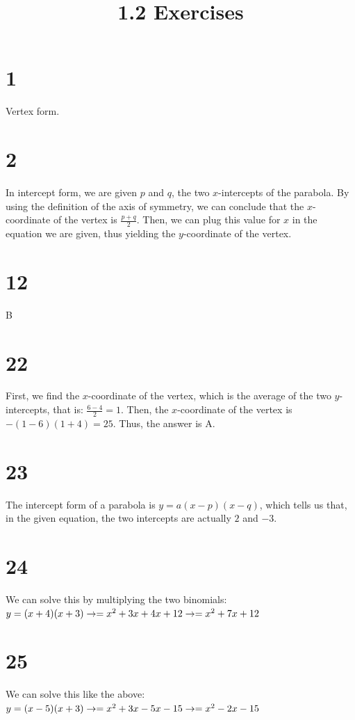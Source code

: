 \documentclass{article}
\title{1.2 Exercises}
\theoremstyle{definition}
\begin{document}
\maketitle


\section*{1}
Vertex form.

\section*{2}
In intercept form, we are given $p$ and $q$, the two $x$-intercepts of the parabola. By using the definition of the axis of symmetry, we can conclude 
that the $x$-coordinate of the vertex is $\frac{p+q}{2}$. Then, we can plug this value for $x$ in the equation we are given, thus yielding the $y$-coordinate
 of the vertex.

\section*{12}
B

\section*{22}
First, we find the $x$-coordinate of the vertex, which is the average of the two $y$-intercepts, that is: $\frac{6-4}{2}=1$. Then, the $x$-coordinate of the 
vertex is $-(1-6)(1+4)=25$. Thus, the answer is A.

\section*{23}
The intercept form of a parabola is $y=a(x-p)(x-q)$, which tells us that, in the given equation, the two intercepts are actually $2$ and $-3$.

\section*{24}
We can solve this by multiplying the two binomials: \newline $y=(x+4)(x+3)\newline\rightarrow =x^2+3x+4x+12\newline\rightarrow =x^2+7x+12$

\section*{25}
We can solve this like the above: \newline $y=(x-5)(x+3)\newline\rightarrow =x^2+3x-5x-15\newline\rightarrow =x^2-2x-15$
\end{document}
